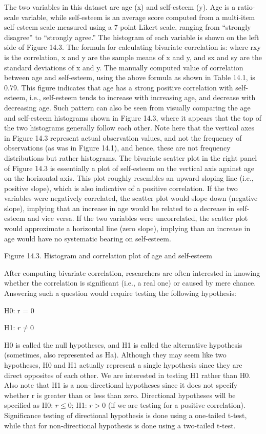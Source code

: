 The two variables in this dataset are age (x) and self-esteem (y). Age is a ratio-scale variable, while self-esteem is an average score computed from a multi-item self-esteem scale measured using a 7-point Likert scale, ranging from “strongly disagree” to “strongly agree.” The histogram of each variable is shown on the left side of Figure 14.3. The formula for calculating bivariate correlation is: where rxy is the correlation, x and y are the sample means of x and y, and sx and sy are the standard deviations of x and y. The manually computed value of correlation between age and self-esteem, using the above formula as shown in Table 14.1, is 0.79. This figure indicates that age has a strong positive correlation with self-esteem, i.e., self-esteem tends to increase with increasing age, and decrease with decreasing age. Such pattern can also be seen from visually comparing the age and self-esteem histograms shown in Figure 14.3, where it appears that the top of the two histograms generally follow each other. Note here that the vertical axes in Figure 14.3 represent actual observation values, and not the frequency of observations (as was in Figure 14.1), and hence, these are not frequency distributions but rather histograms. The bivariate scatter plot in the right panel of Figure 14.3 is essentially a plot of self-esteem on the vertical axis against age on the horizontal axis. This plot roughly resembles an upward sloping line (i.e., positive slope), which is also indicative of a positive correlation. If the two variables were negatively correlated, the scatter plot would slope down (negative slope), implying that an increase in age would be related to a decrease in self-esteem and vice versa. If the two variables were uncorrelated, the scatter plot would approximate a horizontal line (zero slope), implying than an increase in age would have no systematic bearing on self-esteem. 

Figure 14.3. Histogram and correlation plot of age and self-esteem

After computing bivariate correlation, researchers are often interested in knowing whether the correlation is significant (i.e., a real one) or caused by mere chance. Answering such a question would require testing the following hypothesis:

H0: r = 0

H1: $ r \neq 0 $

H0 is called the null hypotheses, and H1 is called the alternative hypothesis (sometimes, also represented as Ha). Although they may seem like two hypotheses, H0 and H1 actually represent a single hypothesis since they are direct opposites of each other. We are interested in testing H1 rather than H0. Also note that H1 is a non-directional hypotheses since it does not specify whether r is greater than or less than zero. Directional hypotheses will be specified as H0: $ r \leq 0 $; H1: $ r > 0 $ (if we are testing for a positive correlation). Significance testing of directional hypothesis is done using a one-tailed t-test, while that for non-directional hypothesis is done using a two-tailed t-test.

